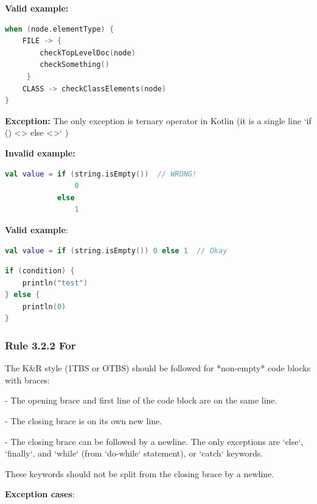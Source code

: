 \textbf{Valid example:}



\begin{lstlisting}[language=Kotlin]
when (node.elementType) {
    FILE -> {
        checkTopLevelDoc(node)
        checkSomething()
     }
    CLASS -> checkClassElements(node)
}
\end{lstlisting}
\textbf{Exception:} The only exception is ternary operator in Kotlin (it is a single line `if () <> else <>` )



\textbf{Invalid example:}



\begin{lstlisting}[language=Kotlin]
val value = if (string.isEmpty())  // WRONG!
                0
            else
                1
\end{lstlisting}


\textbf{Valid example}:



\begin{lstlisting}[language=Kotlin]
val value = if (string.isEmpty()) 0 else 1  // Okay
\end{lstlisting}


\begin{lstlisting}[language=Kotlin]
if (condition) {
    println("test")
} else {
    println(0)
}
\end{lstlisting}


\subsubsection*{\textbf{Rule 3.2.2 For}}
\leavevmode\newline



The K\&R style (1TBS or OTBS) should be followed for *non-empty* code blocks with braces:

- The opening brace and first line of the code block are on the same line.

- The closing brace is on its own new line.

- The closing brace can be followed by a newline. The only exceptions are `else`, `finally`, and `while` (from `do-while` statement), or `catch` keywords.

These keywords should not be split from the closing brace by a newline.



\textbf{Exception cases}:



